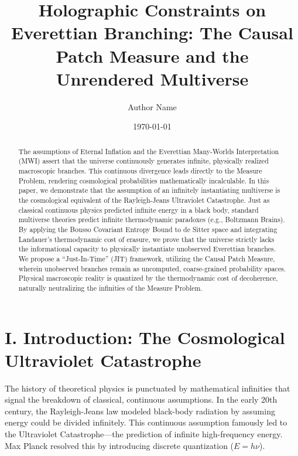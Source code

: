 \documentclass[aps,prd,reprint,superscriptaddress,nofootinbib]{revtex4-2}
\begin{document}
\title{Holographic Constraints on Everettian Branching: The Causal Patch Measure and the Unrendered Multiverse}

\author{Author Name}

\date{\today}

\begin{abstract}
The assumptions of Eternal Inflation and the Everettian Many-Worlds Interpretation (MWI) assert that the universe continuously generates infinite, physically realized macroscopic branches. This continuous divergence leads directly to the Measure Problem, rendering cosmological probabilities mathematically incalculable. In this paper, we demonstrate that the assumption of an infinitely instantiating multiverse is the cosmological equivalent of the Rayleigh-Jeans Ultraviolet Catastrophe. Just as classical continuous physics predicted infinite energy in a black body, standard multiverse theories predict infinite thermodynamic paradoxes (e.g., Boltzmann Brains). By applying the Bousso Covariant Entropy Bound to de Sitter space and integrating Landauer's thermodynamic cost of erasure, we prove that the universe strictly lacks the informational capacity to physically instantiate unobserved Everettian branches. We propose a ``Just-In-Time'' (JIT) framework, utilizing the Causal Patch Measure, wherein unobserved branches remain as uncomputed, coarse-grained probability spaces. Physical macroscopic reality is quantized by the thermodynamic cost of decoherence, naturally neutralizing the infinities of the Measure Problem.
\end{abstract}

\maketitle

\section{I. Introduction: The Cosmological Ultraviolet Catastrophe}

The history of theoretical physics is punctuated by mathematical infinities that signal the breakdown of classical, continuous assumptions. In the early 20th century, the Rayleigh-Jeans law modeled black-body radiation by assuming energy could be divided infinitely. This continuous assumption famously led to the Ultraviolet Catastrophe---the prediction of infinite high-frequency energy. Max Planck resolved this by introducing discrete quantization ($E = h\nu$). 
\end{document}
